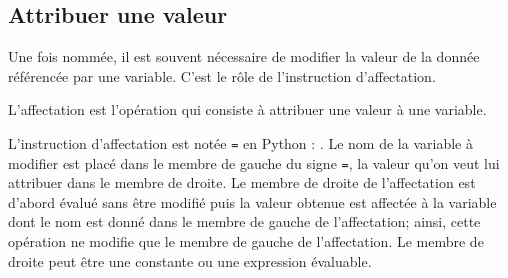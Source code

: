 \subsection{Attribuer une valeur}
Une fois nommée, il est souvent nécessaire de modifier la valeur de la donnée
référencée par une variable. C'est le rôle de l'instruction d'affectation.

\begin{defin}[affectation]\label{def:affectation}
L'affectation est l'opération qui consiste à attribuer une valeur à une variable.
\end{defin}

L'instruction d'affectation est notée {\tt =} en {\sc Python} : . 
Le nom de la variable à modifier est placé dans le membre de gauche du signe {\tt =}, 
la valeur qu'on veut lui attribuer dans le membre de droite. 
Le membre de droite de l'affectation est d'abord évalué sans être modifié
puis la valeur obtenue est affectée à la variable dont le nom est donné dans 
le membre de gauche de l'affectation; ainsi, cette opération ne modifie 
que le membre de gauche de l'affectation.
Le membre de droite peut être une constante ou une expression évaluable.


